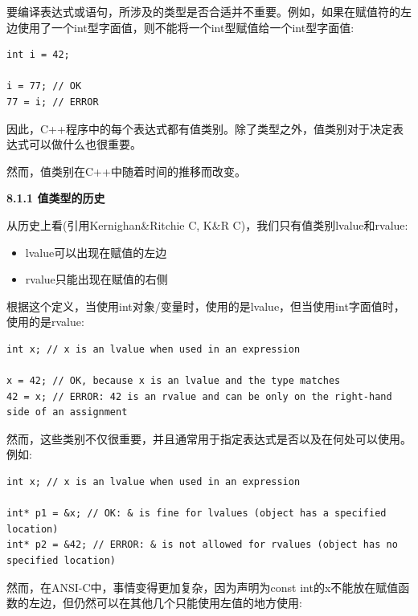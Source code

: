要编译表达式或语句，所涉及的类型是否合适并不重要。例如，如果在赋值符的左边使用了一个int型字面值，则不能将一个int型赋值给一个int型字面值:\par

\begin{lstlisting}[caption={}]
int i = 42;

i = 77; // OK
77 = i; // ERROR
\end{lstlisting}

因此，C++程序中的每个表达式都有值类别。除了类型之外，值类别对于决定表达式可以做什么也很重要。\par

然而，值类别在C++中随着时间的推移而改变。\par

\hspace*{\fill} \par %
\textbf{8.1.1 值类型的历史}

从历史上看(引用Kernighan\&Ritchie C, K\&R C)，我们只有值类别lvalue和rvalue:\par

\begin{itemize}
	\item lvalue可以出现在赋值的左边
	\item rvalue只能出现在赋值的右侧
\end{itemize}

根据这个定义，当使用int对象/变量时，使用的是lvalue，但当使用int字面值时，使用的是rvalue:\par

\begin{lstlisting}[caption={}]
int x; // x is an lvalue when used in an expression

x = 42; // OK, because x is an lvalue and the type matches
42 = x; // ERROR: 42 is an rvalue and can be only on the right-hand side of an assignment
\end{lstlisting}

然而，这些类别不仅很重要，并且通常用于指定表达式是否以及在何处可以使用。例如:\par

\begin{lstlisting}[caption={}]
int x; // x is an lvalue when used in an expression

int* p1 = &x; // OK: & is fine for lvalues (object has a specified location)
int* p2 = &42; // ERROR: & is not allowed for rvalues (object has no specified location)
\end{lstlisting}

然而，在ANSI-C中，事情变得更加复杂，因为声明为const int的x不能放在赋值函数的左边，但仍然可以在其他几个只能使用左值的地方使用:\par

